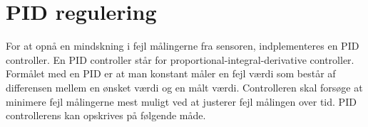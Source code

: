 \section{PID regulering}
For at opnå en mindskning i fejl målingerne fra sensoren, indplementeres en PID controller. En PID controller står for proportional-integral-derivative controller. Formålet med en PID er at man konstant måler en fejl værdi som består af differensen mellem en ønsket værdi og en målt værdi. Controlleren skal forsøge at minimere fejl målingerne mest muligt ved at justerer fejl målingen over tid.\newline
\newline
PID controllerens kan opskrives på følgende måde.


